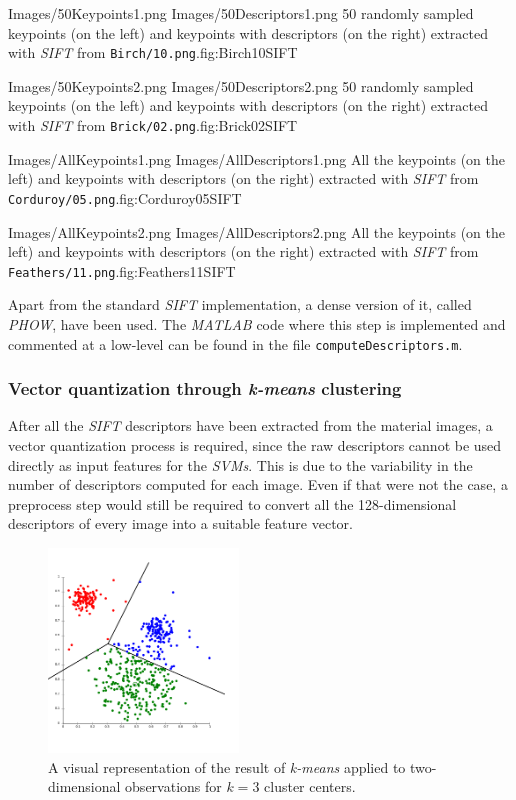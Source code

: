 \plotTwoImages
{Images/50Keypoints1.png}{}{}
{Images/50Descriptors1.png}{}{}
{50 randomly sampled keypoints (on the left) and keypoints with descriptors (on the right) extracted with \emph{SIFT} from \texttt{Birch/10.png}.}{fig:Birch10SIFT}

\plotTwoImages
{Images/50Keypoints2.png}{}{}
{Images/50Descriptors2.png}{}{}
{50 randomly sampled keypoints (on the left) and keypoints with descriptors (on the right) extracted with \emph{SIFT} from \texttt{Brick/02.png}.}{fig:Brick02SIFT}

\plotTwoImages
{Images/AllKeypoints1.png}{}{}
{Images/AllDescriptors1.png}{}{}
{All the keypoints (on the left) and keypoints with descriptors (on the right) extracted with \emph{SIFT} from \texttt{Corduroy/05.png}.}{fig:Corduroy05SIFT}

\plotTwoImages
{Images/AllKeypoints2.png}{}{}
{Images/AllDescriptors2.png}{}{}
{All the keypoints (on the left) and keypoints with descriptors (on the right) extracted with \emph{SIFT} from \texttt{Feathers/11.png}.}{fig:Feathers11SIFT}

Apart from the standard \emph{SIFT} implementation, a dense version of it, called \emph{PHOW}, have been used. The \emph{MATLAB} code where this step is implemented and commented at a low-level can be found in the file \texttt{computeDescriptors.m}.

\newpage
\subsubsection{Vector quantization through \emph{k-means} clustering}

After all the \emph{SIFT} descriptors have been extracted from the material images, a vector quantization process is required, since the raw descriptors cannot be used directly as input features for the \emph{SVMs}. This is due to the variability in the number of descriptors computed for each image. Even if that were not the case, a preprocess step would still be required to convert all the 128-dimensional descriptors of every image into a suitable feature vector. \\

\begin{figure}
    \centering
    \includegraphics[width=0.45\textwidth, trim=0 30 20 20, clip]
                    {Images/KMeans.png}
    \caption{A visual representation\protect\footnotemark\xspace of the result of \emph{k-means} applied to two-dimensional observations for $k=3$ cluster centers.}
    \label{}
\end{figure}

